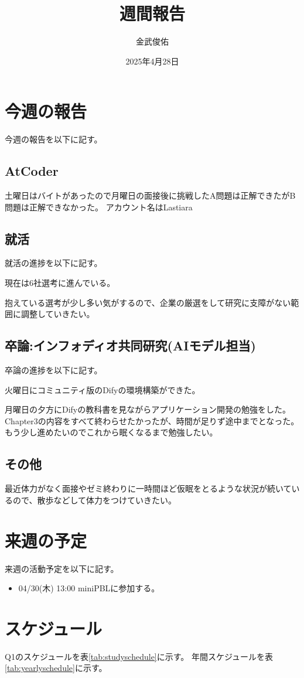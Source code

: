 \documentclass[a4paper,12pt]{ujarticle}
\title{週間報告}
\author{金武俊佑}
\date{2025年4月28日}
\begin{document}
\maketitle

\section{今週の報告}\label{sec:thisweek}
今週の報告を以下に記す。
\subsection{AtCoder}\label{sec:atcoder}
土曜日はバイトがあったので月曜日の面接後に挑戦したA問題は正解できたがB問題は正解できなかった。
アカウント名はLastiara
\subsection{就活}\label{sec:job}
就活の進捗を以下に記す。


現在は6社選考に進んでいる。


抱えている選考が少し多い気がするので、企業の厳選をして研究に支障がない範囲に調整していきたい。
\subsection{卒論:インフォディオ共同研究(AIモデル担当)}\label{sec:thesis}
卒論の進捗を以下に記す。


火曜日にコミュニティ版のDifyの環境構築ができた。


月曜日の夕方にDifyの教科書を見ながらアプリケーション開発の勉強をした。Chapter3の内容をすべて終わらせたかったが、時間が足りず途中までとなった。もう少し進めたいのでこれから眠くなるまで勉強したい。
\subsection{その他}\label{sec:other}
最近体力がなく面接やゼミ終わりに一時間ほど仮眠をとるような状況が続いているので、散歩などして体力をつけていきたい。
\section{来週の予定}\label{sec:nextweek}
来週の活動予定を以下に記す。
\begin{itemize}
  \item 04/30(木) 13:00 miniPBLに参加する。
\end{itemize}


\section{スケジュール}\label{sec:schedule}
Q1のスケジュールを表\ref{tab:studyschedule}に示す。
年間スケジュールを表\ref{tab:yearlyschedule}に示す。
\end{document}
